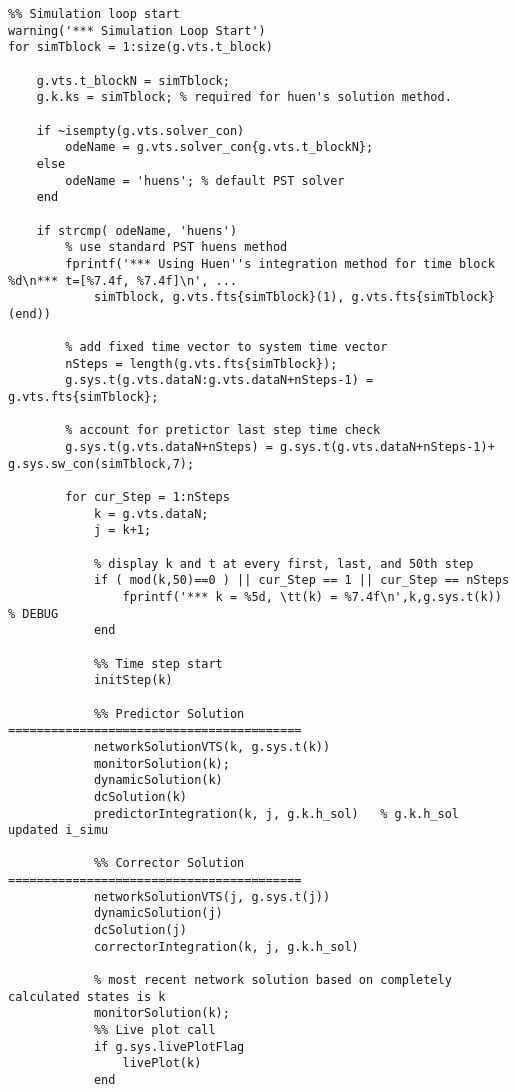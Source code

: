 \begin{verbatim}
%% Simulation loop start
warning('*** Simulation Loop Start')
for simTblock = 1:size(g.vts.t_block)
    
    g.vts.t_blockN = simTblock;
    g.k.ks = simTblock; % required for huen's solution method.
    
    if ~isempty(g.vts.solver_con)
        odeName = g.vts.solver_con{g.vts.t_blockN};
    else
        odeName = 'huens'; % default PST solver
    end
    
    if strcmp( odeName, 'huens')
        % use standard PST huens method
        fprintf('*** Using Huen''s integration method for time block %d\n*** t=[%7.4f, %7.4f]\n', ...
            simTblock, g.vts.fts{simTblock}(1), g.vts.fts{simTblock}(end))
        
        % add fixed time vector to system time vector
        nSteps = length(g.vts.fts{simTblock});
        g.sys.t(g.vts.dataN:g.vts.dataN+nSteps-1) = g.vts.fts{simTblock};
        
        % account for pretictor last step time check
        g.sys.t(g.vts.dataN+nSteps) = g.sys.t(g.vts.dataN+nSteps-1)+ g.sys.sw_con(simTblock,7);
        
        for cur_Step = 1:nSteps
            k = g.vts.dataN;
            j = k+1;
            
            % display k and t at every first, last, and 50th step
            if ( mod(k,50)==0 ) || cur_Step == 1 || cur_Step == nSteps
                fprintf('*** k = %5d, \tt(k) = %7.4f\n',k,g.sys.t(k)) % DEBUG
            end
            
            %% Time step start
            initStep(k)
            
            %% Predictor Solution =========================================
            networkSolutionVTS(k, g.sys.t(k))
            monitorSolution(k);
            dynamicSolution(k)
            dcSolution(k)
            predictorIntegration(k, j, g.k.h_sol)   % g.k.h_sol updated i_simu
            
            %% Corrector Solution =========================================
            networkSolutionVTS(j, g.sys.t(j))
            dynamicSolution(j)
            dcSolution(j)
            correctorIntegration(k, j, g.k.h_sol)
            
            % most recent network solution based on completely calculated states is k
            monitorSolution(k);
            %% Live plot call
            if g.sys.livePlotFlag
                livePlot(k)
            end
            

\end{verbatim}
